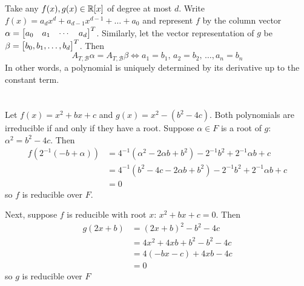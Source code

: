 \documentclass[12pt]{article}
\begin{document}
\subsection{}
Take any $f(x), g(x) \in \mathbb{R}[x]$ of degree at most $d$. 
Write $f(x) = a_d x^d + a_{d - 1}x^{d - 1} + \ldots + a_0$ and represent $f$ by the column vector $\alpha = \begin{bmatrix}a_0 & a_1 & \cdots & a_d\end{bmatrix}^{T}$. 
Similarly, let the vector representation of $g$ be $\beta = \begin{bmatrix}b_0, b_1, \ldots, b_d\end{bmatrix}^{T}$. 
Then 
$$A_{T, \mathcal{B}} \alpha = A_{T, \mathcal{B}} \beta \iff a_1 = b_1, \, a_2 = b_2, \, \ldots, a_n = b_n$$ 
In other words, a polynomial is uniquely determined by its derivative up to the constant term. 

\section{}
Let $f(x) = x^2 + bx + c$ and $g(x) = x^2 -(b^2 - 4c)$. 
Both polynomials are irreducible if and only if they have a root. 
Suppose $\alpha \in F$ is a root of $g$: 
$\alpha^2 = b^2 - 4c$.
Then 
\begin{align*}
  f(2^{-1}(-b + \alpha)) & = 4^{-1} (\alpha^2 - 2\alpha b + b^2) - 2^{-1} b^2 + 2^{-1} \alpha b + c \\ 
                         & = 4^{-1} (b^2 - 4c - 2\alpha b + b^2) - 2^{-1} b^2 + 2^{-1} \alpha b + c \\ 
                         & = 0
\end{align*}
so $f$ is reducible over $F$.  

Next, suppose $f$ is reducible with root $x$: 
$x^2 + bx + c = 0$. 
Then 
\begin{align*}
  g(2x + b) & = (2x + b)^2 - b^2 - 4c \\ 
            & = 4x^2 + 4xb + b^2 - b^2 - 4c \\ 
            & = 4(-bx - c) + 4xb -4c \\ 
            & = 0
\end{align*}
so $g$ is reducible over $F$ 
\end{document}
